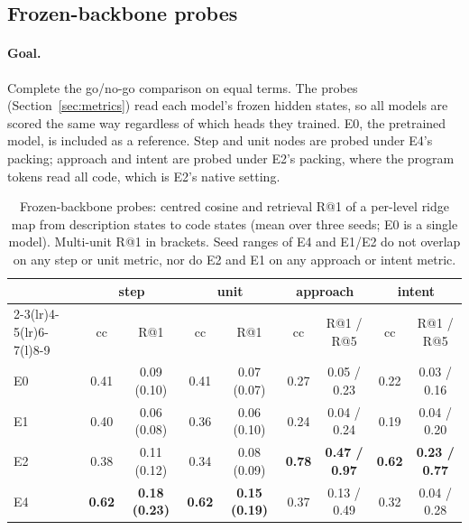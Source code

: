 \documentclass[11pt]{article}
\begin{document}
\subsection{Frozen-backbone probes}
\label{sec:exp-probes}

\paragraph{Goal.} Complete the go/no-go comparison on equal terms. The probes (Section~\ref{sec:metrics}) read each
model's frozen hidden states, so all models are scored the same way regardless of which heads they trained. E0, the
pretrained model, is included as a reference. Step and unit nodes are probed under E4's packing; approach and
intent are probed under E2's packing, where the program tokens read all code, which is E2's native setting.

\begin{table}[t]
\centering
\small
\caption{Frozen-backbone probes: centred cosine and retrieval R@1 of a per-level ridge map from description states to
code states (mean over three seeds; E0 is a single model). Multi-unit R@1 in brackets. Seed ranges of E4 and
E1/E2 do not overlap on any step or unit metric, nor do E2 and E1 on any approach or intent metric.}
\label{tab:probes}
\begin{tabular}{@{}l cc cc cc cc@{}}
\toprule
& \multicolumn{2}{c}{step} & \multicolumn{2}{c}{unit} & \multicolumn{2}{c}{approach} & \multicolumn{2}{c}{intent} \\
\cmidrule(lr){2-3}\cmidrule(lr){4-5}\cmidrule(lr){6-7}\cmidrule(l){8-9}
& cc & R@1 & cc & R@1 & cc & R@1 / R@5 & cc & R@1 / R@5 \\
\midrule
E0 & 0.41 & 0.09 (0.10) & 0.41 & 0.07 (0.07) & 0.27 & 0.05 / 0.23 & 0.22 & 0.03 / 0.16 \\
E1 & 0.40 & 0.06 (0.08) & 0.36 & 0.06 (0.10) & 0.24 & 0.04 / 0.24 & 0.19 & 0.04 / 0.20 \\
E2 & 0.38 & 0.11 (0.12) & 0.34 & 0.08 (0.09) & \textbf{0.78} & \textbf{0.47 / 0.97} & \textbf{0.62} & \textbf{0.23 / 0.77} \\
E4 & \textbf{0.62} & \textbf{0.18 (0.23)} & \textbf{0.62} & \textbf{0.15 (0.19)} & 0.37 & 0.13 / 0.49 & 0.32 & 0.04 / 0.28 \\
\bottomrule
\end{tabular}
\end{table}
\end{document}
